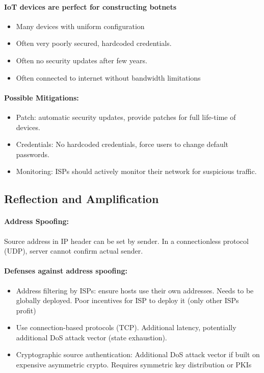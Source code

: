 \paragraph{IoT devices are perfect for constructing botnets}
\begin{itemize}
    \item Many devices with uniform configuration
    \item Often very poorly secured, hardcoded credentials.
    \item Often no security updates after few years.
    \item Often connected to internet without bandwidth limitations
\end{itemize}

\paragraph{Possible Mitigations:}
\begin{itemize}
    \item Patch: automatic security updates, provide patches for full life-time of devices.
    \item Credentials: No hardcoded credentials, force users to change default passwords.
    \item Monitoring: ISPs should actively monitor their network for suspicious traffic.
\end{itemize}

\subsection{Reflection and Amplification}

\paragraph{Address Spoofing:} Source address in IP header can be set by sender. In a connectionless protocol (UDP), server cannot confirm actual sender.

\paragraph{Defenses against address spoofing:}
\begin{itemize}
    \item Address filtering by ISPs: ensure hosts use their own addresses. Needs to be globally deployed. Poor incentives for ISP to deploy it (only other ISPs profit)
    \item Use connection-based protocols (TCP). Additional latency, potentially additional DoS attack vector (state exhaustion).
    \item Cryptographic source authentication: Additional DoS attack vector if built on expensive asymmetric crypto. Requires symmetric key distribution or PKIs
\end{itemize}

